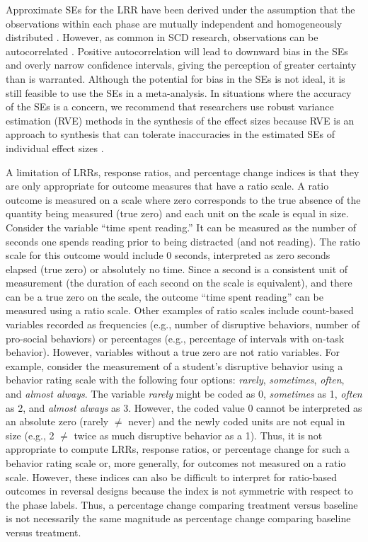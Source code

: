 \documentclass[
]{book}
\begin{document}
Approximate SEs for the LRR have been derived under the assumption that the observations within each phase are mutually independent and homogeneously distributed \citep{pustejovsky2018Using}. However, as common in SCD research, observations can be autocorrelated \citep{matyas1997Serial, Shadish_Sullivan_2011}. Positive autocorrelation will lead to downward bias in the SEs and overly narrow confidence intervals, giving the perception of greater certainty than is warranted. Although the potential for bias in the SEs is not ideal, it is still feasible to use the SEs in a meta-analysis. In situations where the accuracy of the SEs is a concern, we recommend that researchers use robust variance estimation (RVE) methods in the synthesis of the effect sizes because RVE is an approach to synthesis that can tolerate inaccuracies in the estimated SEs of individual effect sizes \citep{Chen_Pustejovsky_2022}.

A limitation of LRRs, response ratios, and percentage change indices is that they are only appropriate for outcome measures that have a ratio scale. A ratio outcome is measured on a scale where zero corresponds to the true absence of the quantity being measured (true zero) and each unit on the scale is equal in size. Consider the variable ``time spent reading.'' It can be measured as the number of seconds one spends reading prior to being distracted (and not reading). The ratio scale for this outcome would include 0 seconds, interpreted as zero seconds elapsed (true zero) or absolutely no time. Since a second is a consistent unit of measurement (the duration of each second on the scale is equivalent), and there can be a true zero on the scale, the outcome ``time spent reading'' can be measured using a ratio scale. Other examples of ratio scales include count-based variables recorded as frequencies (e.g., number of disruptive behaviors, number of pro-social behaviors) or percentages (e.g., percentage of intervals with on-task behavior). However, variables without a true zero are not ratio variables. For example, consider the measurement of a student's disruptive behavior using a behavior rating scale with the following four options: \emph{rarely}, \emph{sometimes}, \emph{often}, and \emph{almost always}. The variable \emph{rarely} might be coded as 0, \emph{sometimes} as 1, \emph{often} as 2, and \emph{almost always} as 3. However, the coded value 0 cannot be interpreted as an absolute zero (rarely \(\ne\) never) and the newly coded units are not equal in size (e.g., 2 \(\ne\) twice as much disruptive behavior as a 1). Thus, it is not appropriate to compute LRRs, response ratios, or percentage change for such a behavior rating scale or, more generally, for outcomes not measured on a ratio scale. However, these indices can also be difficult to interpret for ratio-based outcomes in reversal designs because the index is not symmetric with respect to the phase labels. Thus, a percentage change comparing treatment versus baseline is not necessarily the same magnitude as percentage change comparing baseline versus treatment.
\end{document}
